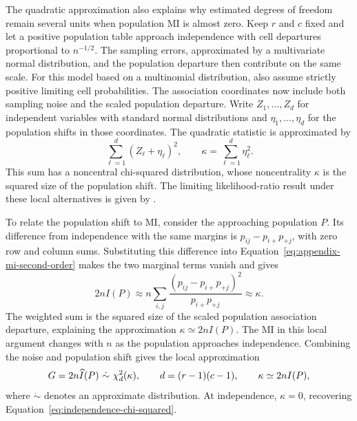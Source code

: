 The quadratic approximation also explains why estimated degrees of freedom
remain several units when population MI is almost zero. Keep \(r\) and
\(c\) fixed and let a positive population table approach independence with
cell departures proportional to \(n^{-1/2}\). The sampling errors, approximated
by a multivariate normal distribution, and the population departure then
contribute on the same scale. For this model based on a multinomial
distribution, also assume strictly positive limiting cell probabilities.
The association coordinates now include both sampling noise and the
scaled population departure. Write \(Z_1,\ldots,Z_d\) for independent
variables with standard normal distributions and
\(\eta_1,\ldots,\eta_d\) for the population shifts in those coordinates.
The quadratic statistic is approximated by
\begin{equation}
 \sum_{\ell=1}^d(Z_\ell+\eta_\ell)^2,
 \qquad \kappa=\sum_{\ell=1}^d\eta_\ell^2.
 \label{eq:local-association-squares}
\end{equation}
This sum has a noncentral chi-squared distribution, whose noncentrality
\(\kappa\) is the squared size of the population shift. The limiting
likelihood-ratio result under these local alternatives is given by
\citet{banerjee2005}.

To relate the population shift to MI, consider the approaching population
\(P\). Its difference from independence with the same margins is
\(p_{ij}-p_{i+}p_{+j}\), with zero row and column sums. Substituting
this difference into Equation~\eqref{eq:appendix-mi-second-order} makes
the two marginal terms vanish and gives
\begin{equation}
 2nI(P)\approx n\sum_{i,j}
       \frac{(p_{ij}-p_{i+}p_{+j})^2}{p_{i+}p_{+j}}
       \approx\kappa.
 \label{eq:local-mi-noncentrality}
\end{equation}
The weighted sum is the squared size of the scaled population association
departure, explaining the approximation \(\kappa\simeq2nI(P)\).
The MI in this local argument changes with \(n\) as the population
approaches independence. Combining the noise and population shift gives
the local approximation
\begin{equation}
 G=2n\widehat I(P)\ \dot\sim\ \chi^2_d(\kappa),
 \qquad d=(r-1)(c-1),\qquad \kappa\simeq2nI(P),
 \label{eq:local-noncentral-mi}
\end{equation}
where \(\dot\sim\) denotes an approximate distribution. At independence,
\(\kappa=0\), recovering Equation~\eqref{eq:independence-chi-squared}.

